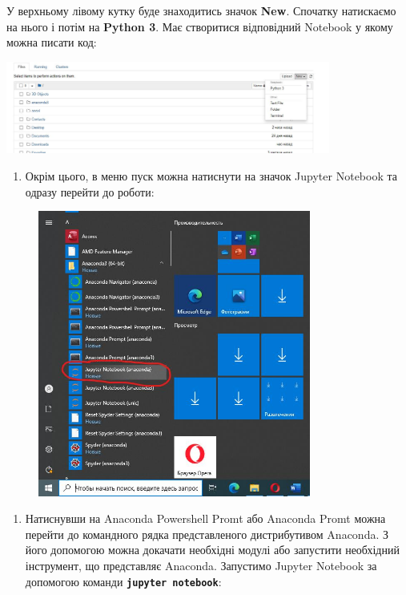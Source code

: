 \documentclass[
  letterpaper,
]{report}
\providecommand{\tightlist}{%
  \setlength{\itemsep}{0pt}\setlength{\parskip}{0pt}}\usepackage{longtable,booktabs,array}
\begin{document}
У верхньому лівому кутку буде знаходитись значок \textbf{New}. Спочатку
натискаємо на нього і потім на \textbf{Python 3}. Має створитися
відповідний Notebook у якому можна писати код:

\includegraphics[width=0.8\textwidth,height=\textheight]{Images/ap1/Screenshot_17.jpg}

\begin{enumerate}
\def\labelenumi{\arabic{enumi}.}
\setcounter{enumi}{14}
\tightlist
\item
  Окрім цього, в меню пуск можна натиснути на значок Jupyter Notebook та
  одразу перейти до роботи:
\end{enumerate}

\begin{figure}

{\centering \includegraphics[width=0.8\textwidth,height=\textheight]{Images/ap1/Screenshot_18.jpg}

}

\end{figure}

\begin{enumerate}
\def\labelenumi{\arabic{enumi}.}
\setcounter{enumi}{15}
\tightlist
\item
  Натиснувши на Anaconda Powershell Promt або Anaconda Promt можна
  перейти до командного рядка представленого дистрибутивом Anaconda. З
  його допомогою можна докачати необхідні модулі або запустити
  необхідний інструмент, що представляє Anaconda. Запустимо Jupyter
  Notebook за допомогою команди \textbf{\texttt{jupyter\ notebook}}:
\end{enumerate}
\end{document}
